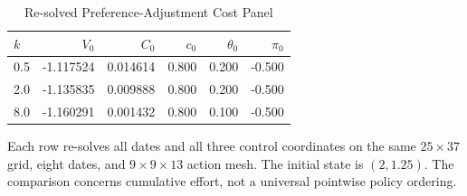 \begin{table}[tbp]
\centering
\caption{Re-solved Preference-Adjustment Cost Panel}
\label{tab:ndu_k}
\small
\begin{tabular}{@{}lrrrrr@{}}
\toprule
$k$ & $V_0$ & $C_0$ & $c_0$ & $\theta_0$ & $\pi_0$ \\
\midrule
0.5 & -1.117524 & 0.014614 & 0.800 & 0.200 & -0.500 \\
2.0 & -1.135835 & 0.009888 & 0.800 & 0.200 & -0.500 \\
8.0 & -1.160291 & 0.001432 & 0.800 & 0.100 & -0.500 \\
\bottomrule
\end{tabular}
\par\smallskip\begin{minipage}{\linewidth}\footnotesize Each row re-solves all dates and all three control coordinates on the same $25\times37$ grid, eight dates, and $9\times9\times13$ action mesh. The initial state is $(2,1.25)$. The comparison concerns cumulative effort, not a universal pointwise policy ordering.\end{minipage}
\end{table}
